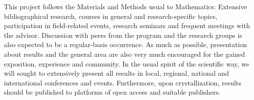 This project follows the Materials and Methods usual to Mathematics: Extensive bibliographical research, courses in general and research-specific topics, participation in field-related events, research seminars and frequent meetings with the advisor. Discussion with peers from the program and the research groups is also expected to be a regular-basis occurrence.  As much as possible, presentation about results and the general area are also very much encouraged for the gained exposition, experience and community. In the usual spirit of the scientific way, we will sought to extensively present all results in local, regional, national and international conferences and events. Furthermore, upon crystallization, results should be published to platforms of open access and suitable publishers.